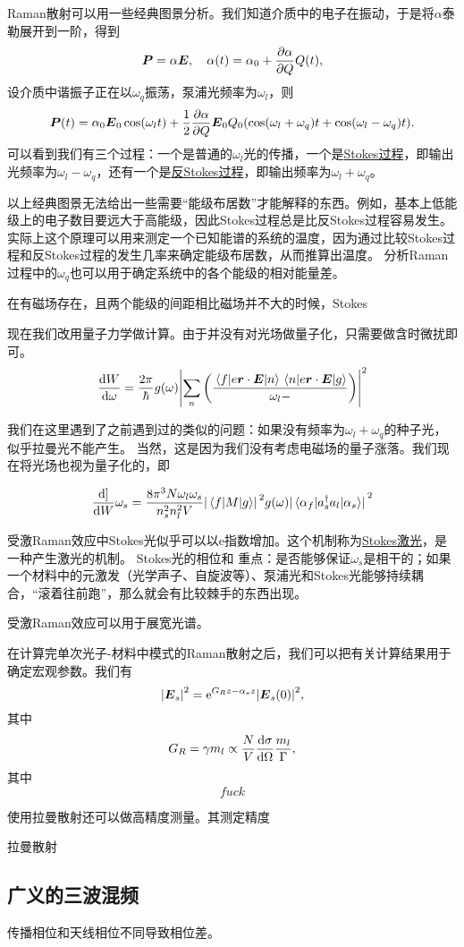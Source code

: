 \documentclass[UTF8, a4paper]{ctexart}
\newcommand*{\ee}{\mathrm{e}}
\newcommand{\concept}[1]{\underline{#1}}
\begin{document}
Raman散射可以用一些经典图景分析。我们知道介质中的电子在振动，于是将$\alpha$泰勒展开到一阶，得到
\begin{equation}
    \vb*{P} = \alpha \vb*{E}, \quad \alpha(t) = \alpha_0 + \pdv{\alpha}{Q} Q(t),
\end{equation}
设介质中谐振子正在以$\omega_q$振荡，泵浦光频率为$\omega_l$，则
\begin{equation}
    \vb*{P}(t) = \alpha_0 \vb*{E}_0 \cos(\omega_l t) + \frac{1}{2} \pdv{\alpha}{Q} \vb*{E}_0 Q_0 (\cos(\omega_l + \omega_q) t + \cos(\omega_l - \omega_q)t).
\end{equation}
可以看到我们有三个过程：一个是普通的$\omega_l$光的传播，一个是\concept{Stokes过程}，即输出光频率为$\omega_l - \omega_q$，还有一个是\concept{反Stokes过程}，即输出频率为$\omega_l + \omega_q$。

以上经典图景无法给出一些需要“能级布居数”才能解释的东西。例如，基本上低能级上的电子数目要远大于高能级，因此Stokes过程总是比反Stokes过程容易发生。
实际上这个原理可以用来测定一个已知能谱的系统的温度，因为通过比较Stokes过程和反Stokes过程的发生几率来确定能级布居数，从而推算出温度。
分析Raman过程中的$\omega_q$也可以用于确定系统中的各个能级的相对能量差。

在有磁场存在，且两个能级的间距相比磁场并不大的时候，Stokes

现在我们改用量子力学做计算。由于并没有对光场做量子化，只需要做含时微扰即可。
\[
    \dv{W}{\omega} = \frac{2\pi}{\hbar} g(\omega) \abs{\sum_n \left(
        \frac{\mel*{f}{e \vb*{r} \cdot \vb*{E}}{n} \mel*{n}{e \vb*{r} \cdot \vb*{E}}{g}}{\omega_l - }
    \right)}^2
\]

我们在这里遇到了之前遇到过的类似的问题：如果没有频率为$\omega_l + \omega_q$的种子光，似乎拉曼光不能产生。
当然，这是因为我们没有考虑电磁场的量子涨落。我们现在将光场也视为量子化的，即

\begin{equation}
    \dv]{W}{\omega_s} = \frac{8\pi^3 N \omega_l \omega_s}{n_s^2 n_l^2 V} \abs*{\mel{f}{M}{g}}^2 g(\omega) \abs*{\mel*{\alpha_f}{a_s^\dagger a_l}{\alpha_s}}^2
\end{equation}

受激Raman效应中Stokes光似乎可以以$\ee$指数增加。这个机制称为\concept{Stokes激光}，是一种产生激光的机制。
Stokes光的相位和
重点：是否能够保证$\omega_s$是相干的；如果一个材料中的元激发（光学声子、自旋波等）、泵浦光和Stokes光能够持续耦合，“滚着往前跑”，那么就会有比较棘手的东西出现。

受激Raman效应可以用于展宽光谱。

在计算完单次光子-材料中模式的Raman散射之后，我们可以把有关计算结果用于确定宏观参数。我们有
\begin{equation}
    \abs{\vb*{E}_s}^2 = \ee^{G_R z - \alpha_s z} \abs{\vb*{E}_s(0)}^2,
\end{equation}
其中
\begin{equation}
    G_R = \gamma m_l \propto \frac{N}{V} \dv{\sigma}{\Omega} \frac{m_l}{\Gamma},
\end{equation}
其中
\[
    fuck%
\]

使用拉曼散射还可以做高精度测量。其测定精度

拉曼散射

\subsection{广义的三波混频}

传播相位和天线相位不同导致相位差。
\end{document}

